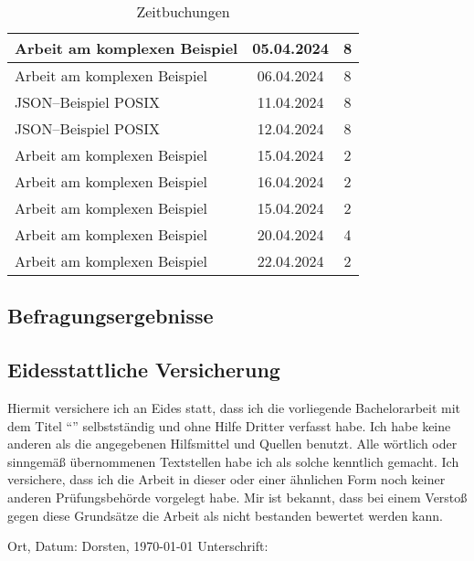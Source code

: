 \begin{table}[H]
\begin{tabular}{|l|c|c|}
        \hline
        Arbeit am komplexen Beispiel           & 05.04.2024 & 8              \\
        \hline
        Arbeit am komplexen Beispiel           & 06.04.2024 & 8              \\
        \hline
        \ac{JSON}--Beispiel \ac{POSIX}         & 11.04.2024 & 8              \\
        \hline
        \ac{JSON}--Beispiel \ac{POSIX}         & 12.04.2024 & 8              \\
        \hline
        Arbeit am komplexen Beispiel           & 15.04.2024 & 2              \\
        \hline
        Arbeit am komplexen Beispiel           & 16.04.2024 & 2              \\
        \hline
        Arbeit am komplexen Beispiel           & 15.04.2024 & 2              \\
        \hline
        Arbeit am komplexen Beispiel           & 20.04.2024 & 4              \\
        \hline
        Arbeit am komplexen Beispiel           & 22.04.2024 & 2              \\
        \hline
    \end{tabular}
    \caption{Zeitbuchungen}
    \label{tab:zeitbuchungen-long}
\end{table}

\subsection{Befragungsergebnisse}\label{appendix:befragungsergebnisse}




\subsection{Eidesstattliche Versicherung}\label{appendix:eidesstattliche-versicherung}
Hiermit versichere ich an Eides statt, dass ich die vorliegende Bachelorarbeit mit dem Titel \enquote{\thetitle} selbstständig und ohne Hilfe Dritter verfasst habe.
Ich habe keine anderen als die angegebenen Hilfsmittel und Quellen benutzt.
Alle wörtlich oder sinngemäß übernommenen Textstellen habe ich als solche kenntlich gemacht.
Ich versichere, dass ich die Arbeit in dieser oder einer ähnlichen Form noch keiner anderen Prüfungsbehörde vorgelegt habe.
Mir ist bekannt, dass bei einem Verstoß gegen diese Grundsätze die Arbeit als nicht bestanden bewertet werden kann.

\vfill

\noindent Ort, Datum: Dorsten, \today \hspace{1cm} Unterschrift: \hrulefill           \\
 \theauthor
